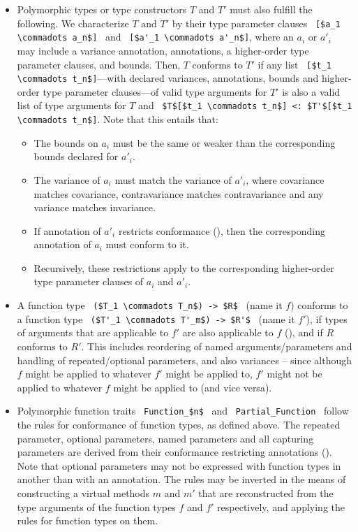 \begin{itemize}
  \item Polymorphic types or type constructors $T$ and $T'$ must also fulfill the following. We characterize $T$ and $T'$ by their type parameter clauses ~\lstinline![$a_1 \commadots a_n$]!~ and ~\lstinline![$a'_1 \commadots a'_n$]!, where an $a_i$ or $a'_i$ may include a variance annotation, annotations, a higher-order type parameter clauses, and bounds. Then, $T$ conforms to $T'$ if any list ~\lstinline![$t_1 \commadots t_n$]!---with declared variances, annotations, bounds and higher-order type parameter clauses---of valid type arguments for $T'$ is also a valid list of type arguments for $T$ and ~\lstinline!$T$[$t_1 \commadots t_n$] <: $T'$[$t_1 \commadots t_n$]!. Note that this entails that:
  \begin{itemize}
    \item The bounds on $a_i$ must be the same or weaker than the corresponding bounds declared for $a'_i$. 
    \item The variance of $a_i$ must match the variance of $a'_i$, where covariance matches covariance, contravariance matches contravariance and any variance matches invariance. 
    \item If annotation of $a'_i$ restricts conformance (), then the corresponding annotation of $a_i$ must conform to it. 
    \item Recursively, these restrictions apply to the corresponding higher-order type parameter clauses of $a_i$ and $a'_i$. 
  \end{itemize}

  \item A function type ~\lstinline!($T_1 \commadots T_n$) -> $R$!~ (name it $f$) conforms to a function type ~\lstinline!($T'_1 \commadots T'_m$) -> $R'$!~ (name it $f'$), if types of arguments that are applicable to $f'$ are also applicable to $f$ (), and if $R$ conforms to $R'$. This includes reordering of named arguments/parameters and handling of repeated/optional parameters, and also variances -- since although $f$ might be applied to whatever $f'$ might be applied to, $f'$ might not be applied to whatever $f$ might be applied to (and vice versa).

  \item Polymorphic function traits ~\lstinline!Function_$n$!~ and ~\lstinline!Partial_Function!~ follow the rules for conformance of function types, as defined above. The repeated parameter, optional parameters, named parameters and all capturing parameters are derived from their conformance restricting annotations (). Note that optional parameters may not be expressed with function types in another than with an annotation. The rules may be inverted in the means of constructing a virtual methods $m$ and $m'$ that are reconstructed from the type arguments of the function types $f$ and $f'$ respectively, and applying the rules for function types on them.
 

\end{itemize}

